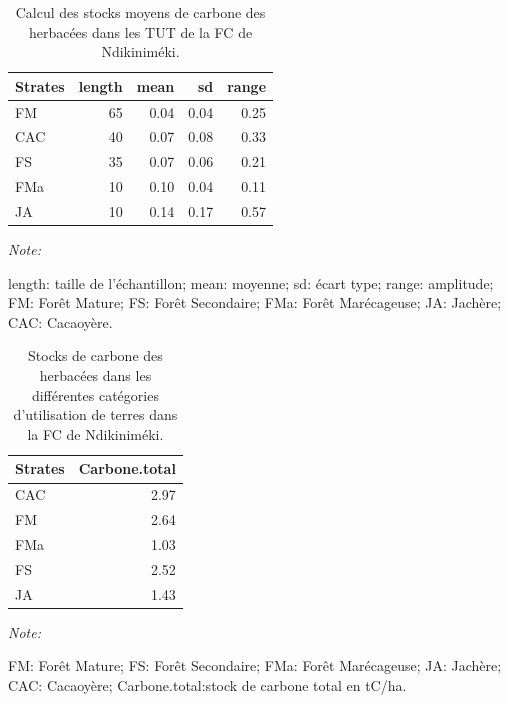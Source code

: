 \documentclass[
  12pt,
  a4paper,
  extrafontsizes,
  onecolumn,
  openright]{book}
\theoremstyle{definition}
\theoremstyle{definition}
\theoremstyle{definition}
\theoremstyle{definition}
\theoremstyle{remark}
\begin{document}
\begin{table}[H]
\centering
\caption{\label{tab:Stocksmoyensherbacees-FCNdiki3}Calcul des stocks moyens de carbone des herbacées dans les TUT de la FC de Ndikiniméki.}
\centering
\begin{threeparttable}
\begin{tabular}[t]{lrrrr}
\toprule
Strates & length & mean & sd & range\\
\midrule
FM & 65 & 0.04 & 0.04 & 0.25\\
CAC & 40 & 0.07 & 0.08 & 0.33\\
FS & 35 & 0.07 & 0.06 & 0.21\\
FMa & 10 & 0.10 & 0.04 & 0.11\\
JA & 10 & 0.14 & 0.17 & 0.57\\
\bottomrule
\end{tabular}
\begin{tablenotes}
\item \textit{Note: } 
\item length: taille de l'échantillon; mean: moyenne; sd: écart type; range: amplitude; FM: Forêt Mature; FS: Forêt Secondaire; FMa: Forêt Marécageuse; JA: Jachère; CAC: Cacaoyère.
\end{tablenotes}
\end{threeparttable}
\end{table}

\begin{table}[H]
\centering
\caption{\label{tab:Stockscarboneherbacees-Ndikinimeki3}Stocks de carbone des herbacées dans les différentes catégories d'utilisation de terres dans la FC de Ndikiniméki.}
\centering
\begin{threeparttable}
\begin{tabular}[t]{lr}
\toprule
Strates & Carbone.total\\
\midrule
CAC & 2.97\\
FM & 2.64\\
FMa & 1.03\\
FS & 2.52\\
JA & 1.43\\
\bottomrule
\end{tabular}
\begin{tablenotes}
\item \textit{Note: } 
\item FM: Forêt Mature; FS: Forêt Secondaire; FMa: Forêt Marécageuse; JA: Jachère; CAC: Cacaoyère; Carbone.total:stock de carbone total en tC/ha.
\end{tablenotes}
\end{threeparttable}
\end{table}
\end{document}
